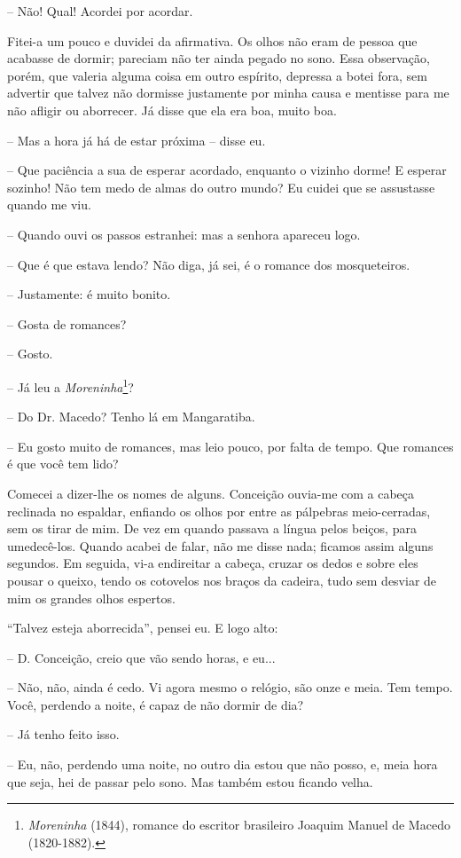 -- Não! Qual! Acordei por acordar.

Fitei-a um pouco e duvidei da afirmativa. Os olhos não eram de pessoa
que acabasse de dormir; pareciam não ter ainda pegado no sono. Essa
observação, porém, que valeria alguma coisa em outro espírito, depressa
a botei fora, sem advertir que talvez não dormisse justamente por minha
causa e mentisse para me não afligir ou aborrecer. Já disse que ela era
boa, muito boa.

-- Mas a hora já há de estar próxima -- disse eu.

-- Que paciência a sua de esperar acordado, enquanto o vizinho dorme! E
esperar sozinho! Não tem medo de almas do outro mundo? Eu cuidei que se
assustasse quando me viu.

-- Quando ouvi os passos estranhei: mas a senhora apareceu logo.

-- Que é que estava lendo? Não diga, já sei, é o romance dos
mosqueteiros.

-- Justamente: é muito bonito.

-- Gosta de romances?

-- Gosto.

-- Já leu a \emph{Moreninha}\footnote{\emph{Moreninha} (1844), romance
  do escritor brasileiro Joaquim Manuel de Macedo (1820-1882).}?

-- Do Dr. Macedo? Tenho lá em Mangaratiba.

-- Eu gosto muito de romances, mas leio pouco, por falta de tempo. Que
romances é que você tem lido?

Comecei a dizer-lhe os nomes de alguns. Conceição ouvia-me com a cabeça
reclinada no espaldar, enfiando os olhos por entre as pálpebras
meio-cerradas, sem os tirar de mim. De vez em quando passava a língua
pelos beiços, para umedecê-los. Quando acabei de falar, não me disse
nada; ficamos assim alguns segundos. Em seguida, vi-a endireitar a
cabeça, cruzar os dedos e sobre eles pousar o queixo, tendo os cotovelos
nos braços da cadeira, tudo sem desviar de mim os grandes olhos
espertos.

``Talvez esteja aborrecida'', pensei eu. E logo alto:

-- D. Conceição, creio que vão sendo horas, e eu...

-- Não, não, ainda é cedo. Vi agora mesmo o relógio, são onze e meia.
Tem tempo. Você, perdendo a noite, é capaz de não dormir de dia?

-- Já tenho feito isso.

-- Eu, não, perdendo uma noite, no outro dia estou que não posso, e,
meia hora que seja, hei de passar pelo sono. Mas também estou ficando
velha.

